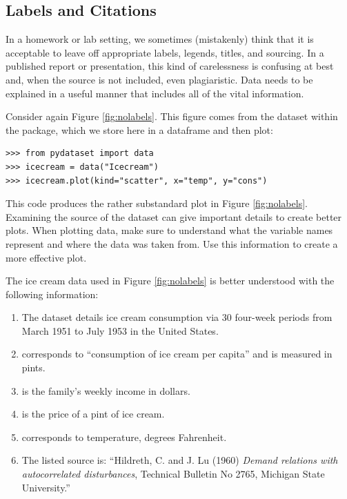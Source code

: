 \subsection*{Labels and Citations} %

In a homework or lab setting, we sometimes (mistakenly) think that it is acceptable to leave off appropriate labels, legends, titles, and sourcing.
In a published report or presentation, this kind of carelessness is confusing at best and, when the source is not included, even plagiaristic.
Data needs to be explained in a useful manner that includes all of the vital information.

Consider again Figure \ref{fig:nolabels}.
This figure comes from the  dataset within the  package, which we store here in a dataframe and then plot:
\begin{lstlisting}
>>> from pydataset import data
>>> icecream = data("Icecream")
>>> icecream.plot(kind="scatter", x="temp", y="cons")
\end{lstlisting}

This code produces the rather substandard plot in Figure \ref{fig:nolabels}.
Examining the source of the dataset can give important details to create better plots.
When plotting data, make sure to understand what the variable names represent and where the data was taken from.
Use this information to create a more effective plot.

The ice cream data used in Figure \ref{fig:nolabels} is better understood with the following information:
\begin{enumerate}
    \item The dataset details ice cream consumption via $30$ four-week periods from March 1951 to July 1953 in the United States.
    \item {} corresponds to ``consumption of ice cream per capita'' and is measured in pints.
    \item {} is the family's weekly income in dollars.
    \item {} is the price of a pint of ice cream.
    \item {} corresponds to temperature, degrees Fahrenheit.
    \item The listed source is: ``Hildreth, C. and J. Lu (1960) \emph{Demand relations with autocorrelated disturbances}, Technical Bulletin No 2765, Michigan State University.''
\end{enumerate}

